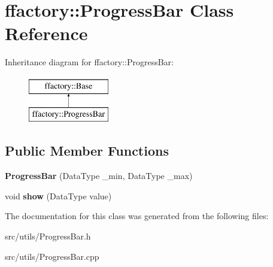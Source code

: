 \hypertarget{classffactory_1_1_progress_bar}{\section{ffactory\-:\-:Progress\-Bar Class Reference}
\label{classffactory_1_1_progress_bar}
}
Inheritance diagram for ffactory\-:\-:Progress\-Bar\-:\begin{figure}[H]
\begin{center}
\leavevmode
\includegraphics[height=2.000000cm]{classffactory_1_1_progress_bar}
\end{center}
\end{figure}
\subsection*{Public Member Functions}
\begin{DoxyCompactItemize}
\item 
\hypertarget{classffactory_1_1_progress_bar_a1e952fe330fd62045acf13dc4d96c487}{{\bfseries Progress\-Bar} (Data\-Type \-\_\-min, Data\-Type \-\_\-max)}\label{classffactory_1_1_progress_bar_a1e952fe330fd62045acf13dc4d96c487}

\item 
\hypertarget{classffactory_1_1_progress_bar_a038fd20ece9c9920b3a13312a497b26c}{void {\bfseries show} (Data\-Type value)}\label{classffactory_1_1_progress_bar_a038fd20ece9c9920b3a13312a497b26c}

\end{DoxyCompactItemize}


The documentation for this class was generated from the following files\-:\begin{DoxyCompactItemize}
\item 
src/utils/Progress\-Bar.\-h\item 
src/utils/Progress\-Bar.\-cpp\end{DoxyCompactItemize}
